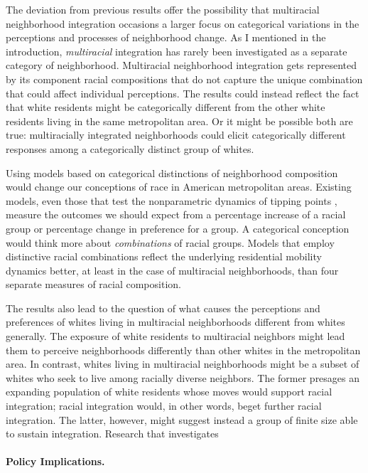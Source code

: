 \documentclass{baderart}
\begin{document}
The deviation from previous results offer the possibility that multiracial neighborhood integration occasions a larger focus on categorical variations in the perceptions and processes of neighborhood change. As I mentioned in the introduction, \emph{multiracial} integration has rarely been investigated as a separate category of neighborhood. Multiracial neighborhood integration gets represented by its component racial compositions that do not capture the unique combination that could affect individual perceptions. The results could instead reflect the fact that white residents might be categorically different from the other white residents living in the same metropolitan area. Or it might be possible both are true: multiracially integrated neighborhoods could elicit categorically different responses among a categorically distinct group of whites. 

Using models based on categorical distinctions of neighborhood composition would change our conceptions of race in American metropolitan areas. Existing models, even those that test the nonparametric dynamics of tipping points \citep[e.g.,][]{schelling_dynamic_1971, bruch_neighborhood_2006, xie_modeling_2012}, measure the outcomes we should expect from a percentage increase of a racial group or percentage change in preference for a group. A categorical conception would think more about \emph{combinations} of racial groups. Models that employ distinctive racial combinations reflect the underlying residential mobility dynamics better, at least in the case of multiracial neighborhoods, than four separate measures of racial composition. 

The results also lead to the question of what causes the perceptions and preferences of whites living in multiracial neighborhoods different from whites generally. The exposure of white residents to multiracial neighbors might lead them to perceive neighborhoods differently than other whites in the metropolitan area. In contrast, whites living in multiracial neighborhoods might be a subset of whites who seek to live among racially diverse neighbors. The former presages an expanding population of white residents whose moves would support racial integration; racial integration would, in other words, beget further racial integration. The latter, however, might suggest instead a group of finite size able to sustain integration. Research that investigates 

\paragraph{Policy Implications.}
\end{document}
